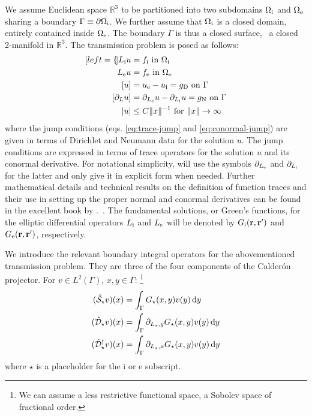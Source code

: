 We assume Euclidean space $\mathbb{R}^3$ to be partitioned into two
subdomains $\Omega_\mathrm{i}$ and $\Omega_\mathrm{e}$ sharing a boundary
$\Gamma\equiv\partial\Omega_\mathrm{i}$.
We further assume that $\Omega_\mathrm{i}$ is a closed domain, entirely contained
inside $\Omega_\mathrm{e}$. The boundary $\Gamma$ is thus a closed surface, \ie~a
closed 2-manifold in $\mathbb{R}^3$.
The transmission problem is posed as follows:
\begin{subequations}\label{eq:transmission}
  \begin{align}[left={\empheqlbrace}]
  \Li u &= f_\mathrm{i} \,\, \text{in}\,\, \Omegai \label{eq:internal} \\
  \Le u &= f_\mathrm{e} \,\, \text{in}\,\, \Omegae \label{eq:external} \\
  [u] &= \ue - \ui = g_\mathrm{D} \,\, \text{on}\,\, \Gamma
  \label{eq:trace-jump} \\
[\partial_L u] &= \partiale u - \partiali u = g_\mathrm{N} \,\,
\text{on}\,\, \Gamma \label{eq:conormal-jump} \\
|u| &\leq C \|x \|^{-1} \,\,\text{for}\,\,\| x \|\rightarrow\infty
\label{eq:radiation}
\end{align}
\end{subequations}
where the jump conditions (eqs. \eqref{eq:trace-jump} and
\eqref{eq:conormal-jump}) are given in terms of Dirichlet and Neumann
data for the solution $u$. The jump conditions are expressed in terms of
trace operators for the solution $u$ and its conormal derivative. For
notational simplicity, will use the symbols $\partial_{L_\mathrm{e}}$ and $\partial_{L_\mathrm{i}}$
for the latter and only give it in explicit form when needed.
Further mathematical details and technical results on the definition of
function traces and their use in setting up the proper normal and
conormal derivatives can be found in the excellent book by
\citeauthor{Sauter2011-an}.~\autocite{Sauter2011-an}.
The
fundamental solutions, or Green's functions, for the elliptic
differential operators $L_\mathrm{i}$ and $L_\mathrm{e}$ will be denoted by $G_\mathrm{i}(\mathbf{r}, \mathbf{r}^\prime)$ and
$G_\mathrm{e}(\mathbf{r}, \mathbf{r}^\prime)$, respectively.

We introduce the relevant boundary integral operators for the
abovementioned transmission problem. They are three of the four
components of the Calder\'on projector.
For $v \in L^2(\Gamma)$, $x, y \in \Gamma$:
\footnote{We can assume a less restrictive functional space, \ie a
Sobolev space of fractional order.}
\begin{equation}
\begin{aligned}
(\hat{\mathcal{S}}_\star v)(x) &= \int_\Gamma G_\star(x, y)v(y)\mathop{}\!\mathrm{d} y \\
(\hat{\mathcal{D}}_\star v)(x) &= \int_\Gamma \partial_{L_\star,y}G_\star(x, y)v(y)\mathop{}\!\mathrm{d} y \\
(\hat{\mathcal{D}}^\dagger_\star v)(x) &= \int_\Gamma \partial_{L_\star,x}G_\star(x, y)v(y)\mathop{}\!\mathrm{d} y \\
\end{aligned}
\end{equation}
where $\star$ is a placeholder for the $\mathrm{i}$ or $\mathrm{e}$ subscript.

